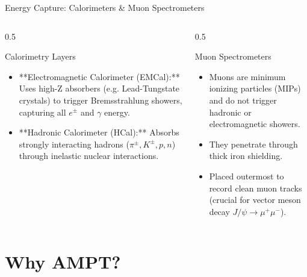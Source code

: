 \documentclass[aspectratio=169]{beamer}
\begin{document}
\begin{frame}{Energy Capture: Calorimeters \& Muon Spectrometers}
    \begin{columns}
        \begin{column}{0.5\textwidth}
            \begin{block}{Calorimetry Layers}
                \begin{itemize}
                    \item **Electromagnetic Calorimeter (EMCal):** Uses high-Z absorbers (e.g. Lead-Tungstate crystals) to trigger Bremsstrahlung showers, capturing all $e^\pm$ and $\gamma$ energy.
                    \item **Hadronic Calorimeter (HCal):** Absorbs strongly interacting hadrons ($\pi^\pm, K^\pm, p, n$) through inelastic nuclear interactions.
                \end{itemize}
            \end{block}
        \end{column}
        \begin{column}{0.5\textwidth}
            \begin{block}{Muon Spectrometers}
                \begin{itemize}
                    \item Muons are minimum ionizing particles (MIPs) and do not trigger hadronic or electromagnetic showers.
                    \item They penetrate through thick iron shielding.
                    \item Placed outermost to record clean muon tracks (crucial for vector meson decay $J/\psi \rightarrow \mu^+\mu^-$).
                \end{itemize}
            \end{block}
        \end{column}
    \end{columns}
\end{frame}

\section{Why AMPT?}
\end{document}
